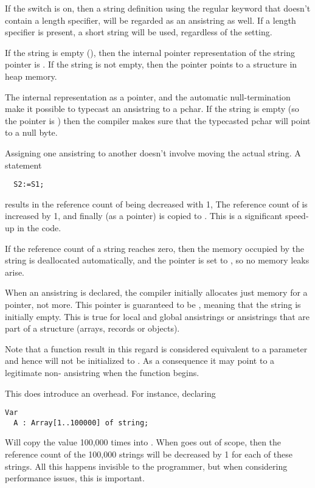 If the  switch is on, then a string definition using the
regular  keyword that doesn't contain a length specifier, 
will be regarded as an ansistring as well. If a length specifier is present,
a short string will be used, regardless of the  setting.

If the string is empty (), then the internal pointer representation
of the string pointer is . If the string is not empty, then the 
pointer points to a structure in heap memory.

The internal representation as a pointer, and the automatic null-termination
make it possible to typecast an ansistring to a pchar. If the string is empty 
(so the pointer is ) then the compiler makes sure that the typecasted 
pchar will point to a null byte.

Assigning one ansistring to another doesn't involve moving the actual
string. A statement
\begin{verbatim}
  S2:=S1;
\end{verbatim}
results in the reference count of  being decreased with 1,
The reference count of  is increased by 1, and finally 
(as a pointer) is copied to . This is a significant speed-up in
the code.

If the reference count of a string reaches zero, then the memory occupied 
by the string is deallocated automatically, and the pointer is set to
, so no memory leaks arise.

When an ansistring is declared, the \fpc compiler initially
allocates just memory for a pointer, not more. This pointer is guaranteed
to be , meaning that the string is initially empty. This is
true for local and global ansistrings or ansistrings that are part of a 
structure (arrays, records or objects).

\begin{remark}
Note that a function result in this regard is considered equivalent to a 
parameter and hence will not be initialized to . As a consequence
it may point to a legitimate non- ansistring when the function
begins.
\end{remark}

This  does introduce an overhead. For instance, declaring
\begin{verbatim}
Var
  A : Array[1..100000] of string;
\end{verbatim}
Will copy the value  100,000 times into . 
When  goes out of scope, then the reference 
count of the 100,000 strings will be decreased by 1 for each
of these strings. All this happens invisible to the programmer, 
but when considering performance issues, this is important.


